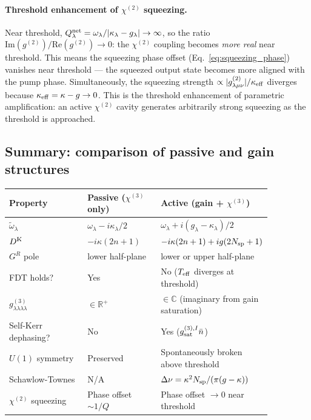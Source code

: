 \documentclass[12pt]{article}
\newcommand{\Keldysh}{{\rm K}}
\newcommand{\tomega}{\tilde{\omega}}
\begin{document}
\paragraph{Threshold enhancement of $\chi^{(2)}$ squeezing.}
Near threshold, $Q_\lambda^{\rm net} = \omega_\lambda/|\kappa_\lambda-g_\lambda|
\to\infty$, so the ratio
$\mathrm{Im}(g^{(2)})/\mathrm{Re}(g^{(2)}) \to 0$: the $\chi^{(2)}$ coupling
becomes \emph{more real} near threshold.  This means the squeezing phase
offset (Eq.~\ref{eq:squeezing_phase}) vanishes near threshold ---
the squeezed output state becomes more aligned with the pump phase.
Simultaneously, the squeezing strength $\propto|g^{(2)}_{\lambda\mu\nu}|/
\kappa_{\rm eff}$ diverges because $\kappa_{\rm eff} = \kappa - g \to 0$.
This is the threshold enhancement of parametric amplification:
an active $\chi^{(2)}$ cavity generates arbitrarily strong squeezing
as the threshold is approached.

\subsection{Summary: comparison of passive and gain structures}

\begin{center}
\begin{tabular}{p{0.30\linewidth}p{0.28\linewidth}p{0.28\linewidth}}
\toprule
Property & Passive ($\chi^{(3)}$ only) & Active (gain + $\chi^{(3)}$)\\
\midrule
$\tomega_\lambda$ & $\omega_\lambda - i\kappa_\lambda/2$ &
$\omega_\lambda + i(g_\lambda-\kappa_\lambda)/2$\\[4pt]
$D^\Keldysh$ & $-i\kappa(2n+1)$ &
$-i\kappa(2n+1) + ig(2N_{\rm sp}+1)$\\[4pt]
$G^R$ pole & lower half-plane & lower or upper half-plane\\[4pt]
FDT holds? & Yes & No ($T_{\rm eff}$ diverges at threshold)\\[4pt]
$g^{(3)}_{\lambda\lambda\lambda\lambda}$ & $\in\mathbb{R}^+$ &
$\in\mathbb{C}$ (imaginary from gain saturation)\\[4pt]
Self-Kerr dephasing? & No & Yes ($g^{(3),I}_{\rm sat}\bar{n}$)\\[4pt]
$U(1)$ symmetry & Preserved & Spontaneously broken above threshold\\[4pt]
Schawlow-Townes & N/A &
$\Delta\nu = \kappa^2 N_{\rm sp}/(\pi(g-\kappa))$\\[4pt]
$\chi^{(2)}$ squeezing & Phase offset $\sim 1/Q$ &
Phase offset $\to 0$ near threshold\\
\bottomrule
\end{tabular}
\end{center}
\end{document}
